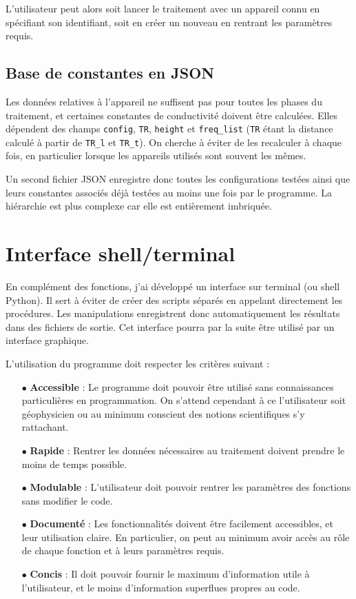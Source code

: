 \documentclass[12pt]{article}
\begin{document}
    L'utilisateur peut alors soit lancer le traitement avec un appareil connu en spécifiant son identifiant, soit en créer un nouveau en rentrant les paramètres requis.

\subsection{Base de constantes en JSON}
    Les données relatives à l'appareil ne suffisent pas pour toutes les phases du traitement, et certaines constantes de conductivité doivent être calculées. Elles dépendent des champs \texttt{config}, \texttt{TR}, \texttt{height} et \texttt{freq\_list} (\texttt{TR} étant la distance calculé à partir de \texttt{TR\_l} et \texttt{TR\_t}). On cherche à éviter de les recalculer à chaque fois, en particulier lorsque les appareils utilisés sont souvent les mêmes.

    Un second fichier JSON enregistre donc toutes les configurations testées ainsi que leurs constantes associés déjà testées au moins une fois par le programme. La hiérarchie est plus complexe car elle est entièrement imbriquée.

\newpage
\section{Interface shell/terminal}

    En complément des fonctions, j'ai développé un interface sur terminal (ou shell Python). Il sert à éviter de créer des scripts séparés en appelant directement les procédures. Les manipulations enregistrent donc automatiquement les résultats dans des fichiers de sortie. Cet interface pourra par la suite être utilisé par un interface graphique.
    
    L'utilisation du programme doit respecter les critères suivant :
    \begin{enumerate}
        \item[$\bullet$] \textbf{Accessible} : Le programme doit pouvoir être utilisé sans connaissances particulières en programmation. On s'attend cependant à ce l'utilisateur soit géophysicien ou au minimum conscient des notions scientifiques  s'y rattachant.
        \item[$\bullet$] \textbf{Rapide} : Rentrer les données nécessaires au traitement doivent prendre le moins de temps possible.
        \item[$\bullet$] \textbf{Modulable} : L'utilisateur doit pouvoir rentrer les paramètres des fonctions sans modifier le code.
        \item[$\bullet$] \textbf{Documenté} : Les fonctionnalités doivent être facilement accessibles, et leur utilisation claire. En particulier, on peut au minimum avoir accès au rôle de chaque fonction et à leurs paramètres requis.
        \item[$\bullet$] \textbf{Concis} : Il doit pouvoir fournir le maximum d'information utile à l'utilisateur, et le moins d'information superflues propres au code.
    \end{enumerate}
\end{document}
